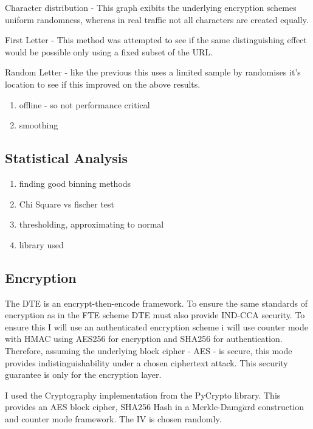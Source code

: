 \documentclass[10pt,a4paper]{article}
\begin{document}
Character distribution - This graph exibits the underlying encryption schemes uniform randomness, whereas in real traffic not all characters are created equally.

First Letter - This method was attempted to see if the same distinguishing effect would be possible only using a fixed subset of the URL.

Random Letter - like the previous this uses a limited sample by randomises it's location to see if this improved on the above results.


\begin{enumerate}
\item offline - so not performance critical
\item smoothing
\end{enumerate}

\subsection{Statistical Analysis}

\begin{enumerate}
\item finding good binning methods
\item Chi Square vs fischer test
\item thresholding, approximating to normal
\item library used
\end{enumerate}

\subsection{Encryption}

The DTE is an encrypt-then-encode framework. To ensure the same standards of encryption as in the FTE scheme DTE must also provide IND-CCA security. To ensure this I will use an authenticated encryption scheme i will use counter mode with HMAC using AES256 for encryption and SHA256 for authentication. Therefore, assuming the underlying block cipher - AES - is secure, this mode provides indistinguishability under a chosen ciphertext attack. This security guarantee is only for the encryption layer. 


I used the Cryptography implementation from the PyCrypto library. This provides an AES block cipher, SHA256 Hash in a Merkle-Damg$\mathring{a}$rd construction and counter mode framework. The IV is chosen randomly.
\end{document}
